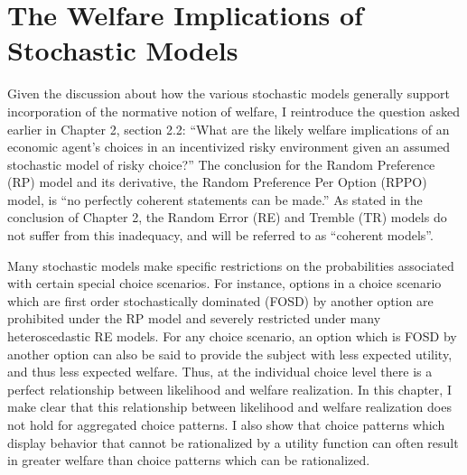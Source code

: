 \documentclass[../main.tex]{subfiles}
\begin{document}
\doublespacing
\setcounter{chapter}{2}

\singlespacing
\chapter{The Welfare Implications of Stochastic Models}
\doublespacing

\lltoc %

Given the discussion about how the various stochastic models generally support incorporation of the normative notion of welfare, I reintroduce the question asked earlier in Chapter 2, section 2.2:
\enquote{What are the likely welfare implications of an economic agent's choices in an incentivized risky environment given an assumed stochastic model of risky choice?}
The conclusion for the Random Preference (RP) model and its derivative, the Random Preference Per Option (RPPO) model, is \enquote{no perfectly coherent statements can be made.}
As stated in the conclusion of Chapter 2, the Random Error (RE) and Tremble (TR) models do not suffer from this inadequacy, and will be referred to as \enquote{coherent models}.

Many stochastic models make specific restrictions on the probabilities associated with certain special choice scenarios.
For instance, options in a choice scenario which are first order stochastically dominated (FOSD) by another option are prohibited under the RP model and severely restricted under many heteroscedastic RE models.
For any choice scenario, an option which is FOSD by another option can also be said to provide the subject with less expected utility, and thus less expected welfare.
Thus, at the individual choice level there is a perfect relationship between likelihood and welfare realization.
In this chapter, I make clear that this relationship between likelihood and welfare realization does not hold for aggregated choice patterns.
I also show that choice patterns which display behavior that cannot be rationalized by a utility function can often result in greater welfare than choice patterns which can be rationalized.
\end{document}
